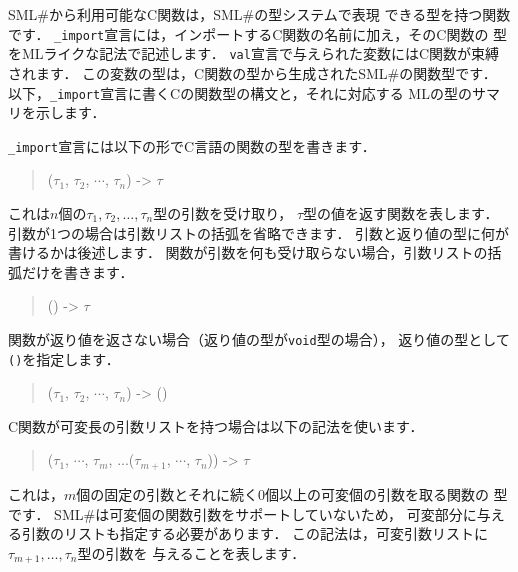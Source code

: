 \documentclass{jbook}
\newcommand{\smlsharp}{SML\#}
\newenvironment{program}{\begin{quote}\begin{tt}}%
                        {\end{tt}\end{quote}}
\begin{document}
\ifjp%
	\smlsharp{}から利用可能なC関数は，\smlsharp{}の型システムで表現
できる型を持つ関数です．
	{\tt \_import}宣言には，インポートするC関数の名前に加え，そのC関数の
型をMLライクな記法で記述します．
	{\tt val}宣言で与えられた変数にはC関数が束縛されます．
	この変数の型は，C関数の型から生成された\smlsharp{}の関数型です．
	以下，{\tt \_import}宣言に書くCの関数型の構文と，それに対応する
MLの型のサマリを示します．

	{\tt \_import}宣言には以下の形でC言語の関数の型を書きます．
\begin{program}
($\tau_1$, $\tau_2$, $\cdots$, $\tau_n$) -> $\tau$
\end{program}
	これは$n$個の$\tau_1, \tau_2, \ldots, \tau_n$型の引数を受け取り，
$\tau$型の値を返す関数を表します．
	引数が1つの場合は引数リストの括弧を省略できます．
	引数と返り値の型に何が書けるかは後述します．
	関数が引数を何も受け取らない場合，引数リストの括弧だけを書きます．
\begin{program}
() -> $\tau$
\end{program}
	関数が返り値を返さない場合（返り値の型が{\tt void}型の場合），
返り値の型として{\tt ()}を指定します．
\begin{program}
($\tau_1$, $\tau_2$, $\cdots$, $\tau_n$) -> ()
\end{program}
	C関数が可変長の引数リストを持つ場合は以下の記法を使います．
\begin{program}
($\tau_1$, $\cdots$, $\tau_m$, ...($\tau_{m+1}$, $\cdots$, $\tau_{n}$)) -> $\tau$
\end{program}
	これは，$m$個の固定の引数とそれに続く0個以上の可変個の引数を取る関数の
型です．
	\smlsharp{}は可変個の関数引数をサポートしていないため，
可変部分に与える引数のリストも指定する必要があります．
	この記法は，可変引数リストに$\tau_{m+1}, \ldots, \tau_{n}$型の引数を
与えることを表します．
\end{document}
